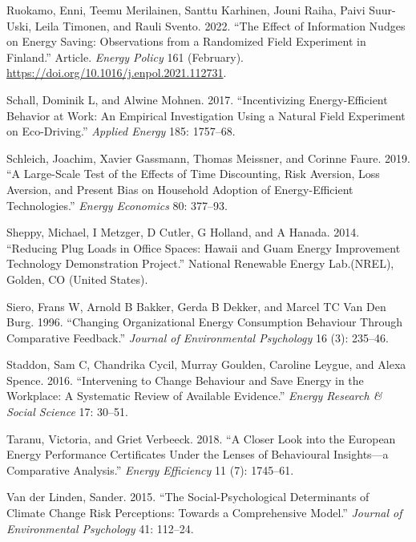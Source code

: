 \documentclass[
  11pt,
  captions=heading]{scrreport}
\newlength{\cslhangindent}
\newlength{\cslentryspacingunit} %
\newenvironment{CSLReferences}[2] %
 {%
  \setlength{\parindent}{0pt}
  \ifodd #1
  \let\oldpar\par
  \def\par{\hangindent=\cslhangindent\oldpar}
  \fi
  \setlength{\parskip}{#2\cslentryspacingunit}
 }%
 {}
\begin{document}
\begin{CSLReferences}{1}{0}
\leavevmode{}%
Ruokamo, Enni, Teemu Merilainen, Santtu Karhinen, Jouni Raiha, Paivi
Suur-Uski, Leila Timonen, and Rauli Svento. 2022. {``The Effect of
Information Nudges on Energy Saving: Observations from a Randomized
Field Experiment in Finland.''} Article. \emph{Energy Policy} 161
(February). \url{https://doi.org/10.1016/j.enpol.2021.112731}.

\leavevmode{}%
Schall, Dominik L, and Alwine Mohnen. 2017. {``Incentivizing
Energy-Efficient Behavior at Work: An Empirical Investigation Using a
Natural Field Experiment on Eco-Driving.''} \emph{Applied Energy} 185:
1757--68.

\leavevmode{}%
Schleich, Joachim, Xavier Gassmann, Thomas Meissner, and Corinne Faure.
2019. {``A Large-Scale Test of the Effects of Time Discounting, Risk
Aversion, Loss Aversion, and Present Bias on Household Adoption of
Energy-Efficient Technologies.''} \emph{Energy Economics} 80: 377--93.

\leavevmode{}%
Sheppy, Michael, I Metzger, D Cutler, G Holland, and A Hanada. 2014.
{``Reducing Plug Loads in Office Spaces: Hawaii and Guam Energy
Improvement Technology Demonstration Project.''} National Renewable
Energy Lab.(NREL), Golden, CO (United States).

\leavevmode{}%
Siero, Frans W, Arnold B Bakker, Gerda B Dekker, and Marcel TC Van Den
Burg. 1996. {``Changing Organizational Energy Consumption Behaviour
Through Comparative Feedback.''} \emph{Journal of Environmental
Psychology} 16 (3): 235--46.

\leavevmode{}%
Staddon, Sam C, Chandrika Cycil, Murray Goulden, Caroline Leygue, and
Alexa Spence. 2016. {``Intervening to Change Behaviour and Save Energy
in the Workplace: A Systematic Review of Available Evidence.''}
\emph{Energy Research \& Social Science} 17: 30--51.

\leavevmode{}%
Taranu, Victoria, and Griet Verbeeck. 2018. {``A Closer Look into the
European Energy Performance Certificates Under the Lenses of Behavioural
Insights---a Comparative Analysis.''} \emph{Energy Efficiency} 11 (7):
1745--61.

\leavevmode{}%
Van der Linden, Sander. 2015. {``The Social-Psychological Determinants
of Climate Change Risk Perceptions: Towards a Comprehensive Model.''}
\emph{Journal of Environmental Psychology} 41: 112--24.


\end{CSLReferences}
\end{document}
